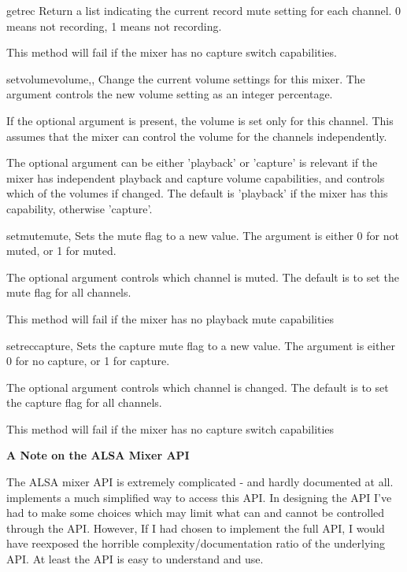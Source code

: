 \begin{methoddesc}[Mixer]{getrec}{}
Return a list indicating the current record mute setting for each channel. 0 means not recording, 1 
means not recording.

This method will fail if the mixer has no capture switch capabilities.
\end{methoddesc}

\begin{methoddesc}[Mixer]{setvolume}{volume,,}
Change the current volume settings for this mixer. The  argument controls
the new volume setting as an integer percentage.

If the optional argument  is present, the volume is set only for this channel. This
assumes that the mixer can control the volume for the channels independently.

The optional  argument can be either 'playback' or 'capture' is relevant if the mixer
has independent playback and capture volume capabilities, and controls which of the volumes
if changed. The default is 'playback' if the mixer has this capability, otherwise 'capture'.
\end{methoddesc}

\begin{methoddesc}[Mixer]{setmute}{mute, }
Sets the mute flag to a new value. The  argument is either 0 for not muted, or 1 for muted.

The optional  argument controls which channel is muted. The default is to set the mute flag
for all channels.

This method will fail if the mixer has no playback mute capabilities
\end{methoddesc}

\begin{methoddesc}[Mixer]{setrec}{capture,}
Sets the capture mute flag to a new value. The  argument is either 0 for no capture, 
or 1 for capture.

The optional  argument controls which channel is changed. The default is to set the capture flag
for all channels.

This method will fail if the mixer has no capture switch capabilities
\end{methoddesc}


\textbf{A Note on the ALSA Mixer API}

The ALSA mixer API is extremely complicated - and hardly documented at all.  implements
a much simplified way to access this API. In designing the API I've had to make some choices which
may limit what can and cannot be controlled through the API. However, If I had chosen to implement the
full API, I would have reexposed the horrible complexity/documentation ratio of the underlying API.
At least the  API is easy to understand and use.

